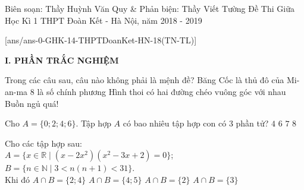 \begin{name}
{Biên soạn: Thầy Huỳnh Văn Quy \& Phản biện: Thầy Viết Tường}
{Đề Thi Giữa Học Kì 1 THPT Đoàn Kết - Hà Nội, năm 2018 - 2019}
\end{name}

\setcounter{ex}{0}\setcounter{bt}{0}
[ans/ans-0-GHK-14-THPTDoanKet-HN-18(TN-TL)]

\noindent\textbf{I. PHẦN TRẮC NGHIỆM}

\begin{ex}%
	Trong các câu sau, câu nào không phải là mệnh đề?
	\choice
	{Băng Cốc là thủ đô của Mi-an-ma}
	{$8$ là số chính phương}
	{Hình thoi có hai đường chéo vuông góc với nhau}
	{\True Buồn ngủ quá!}
\end{ex}

\begin{ex}%
	Cho $A=\{0;2;4;6\}$. Tập hợp $A$ có bao nhiêu tập hợp con có $3$ phần tử?
	\choice
	{\True $4$}
	{$6$}
	{$7$}
	{$8$}
\end{ex}

\begin{ex}%
	Cho các tập hợp sau:\\ 
	$A=\{x\in\mathbb{R}\mid (x-2x^2)(x^2-3x+2)=0\}$;\\ $B=\{n\in\mathbb{N}\mid 3<n(n+1)<31\}$.\\ 
	Khi đó
	\choice
	{$A\cap B=\{2;4\}$}
	{$A\cap B=\{4;5\}$}
	{\True $A\cap B=\{2\}$}
	{$A\cap B=\{3\}$}
\end{ex}

